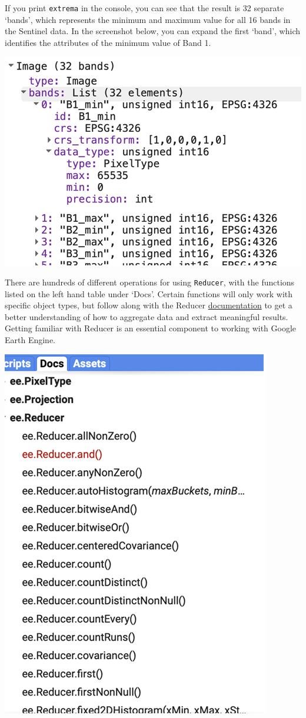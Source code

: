 \documentclass[
]{article}
\begin{document}
If you print \texttt{extrema} in the console, you can see that the result is 32 separate `bands', which represents the minimum and maximum value for all 16 bands in the Sentinel data. In the screenshot below, you can expand the first `band', which identifies the attributes of the minimum value of Band 1.

\begin{center}\includegraphics[width=0.5\linewidth]{./im/im_01_03} \end{center}

There are hundreds of different operations for using \texttt{Reducer}, with the functions listed on the left hand table under `Docs'. Certain functions will only work with specific object types, but follow along with the Reducer \href{https://developers.google.com/earth-engine/guides/reducers_intro}{documentation} to get a better understanding of how to aggregate data and extract meaningful results. Getting familiar with Reducer is an essential component to working with Google Earth Engine.

\begin{center}\includegraphics[width=0.5\linewidth]{./im/im_01_04} \end{center}
\end{document}
